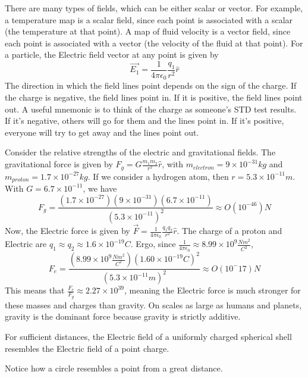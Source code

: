 \documentclass[nobib]{tufte-handout}
\begin{document}
There are many types of fields, which can be either scalar 
or vector. 
For example, a temperature map is a scalar field, since
each point is associated with a scalar (the temperature at that 
point). A map of fluid velocity is a vector field, since each point 
is associated with a vector (the velocity of the fluid at that point).
For a particle, the Electric field vector at any point is given by
\[\vec{E_1} = \frac{1}{4\pi \epsilon_0}\frac{q_1}{r^2}\hat{r}\]
The direction in which the field lines point depends on the 
sign of the charge. If the charge is negative, the field lines point in.
If it is positive, the field lines point out. A useful mnemonic is
to think of the charge as someone's STD test results. If it's negative,
others will go for them and the lines point in. If it's positive, everyone
will try to get away and the lines point out.

Consider the relative strengths of the electric and 
gravitational fields. The gravitational force is given by
$F_g = G\frac{m_1m_2}{r^2}\hat{r}$, with $m_{electron} = 9 \times 10^{-31} kg$
and $m_{proton} = 1.7 \times 10^{-27} kg$. If we consider a hydrogen atom,  
then $r = 5.3 \times 10^{-11} m$. With $G = 6.7 \times 10^{-11}$, we have 
\[F_g = \frac{(1.7 \times 10^{-27})(9 \times 10^{-31})(6.7 \times 10^{-11})}{(5.3 \times 10^{-11})^2} \approx O(10^{-46})N\]
Now, the Electric force is given by $\vec{F} = \frac{1}{4\pi \epsilon_0}\frac{q_1 q_2}{r^2}\hat{r}$. 
The charge of a proton and Electric are $q_1 \approx q_2 \approx 1.6 \times 10^{-19} C$.
Ergo, since $\frac{1}{4\pi \epsilon_0} \approx 8.99 \times 10^9 \frac{Nm^2}{C^2}$, 
\[F_e = \frac{(8.99 \times 10^9 \frac{Nm^2}{C^2})(1.60\times10^{-19}C)^2}{(5.3\times10^{-11}m)^2} \approx O(10^-17)N\]
This means that $\frac{F_e}{F_g}\approx 2.27 \times 10^{39}$, meaning the Electric force is
much stronger for these masses and charges than gravity. On scales as large as humans and planets,
gravity is the dominant force because gravity is strictly additive.

For sufficient distances, the Electric field
of a uniformly charged spherical shell resembles
the Electric field of a point charge. 

\begin{marginfigure}
    \begin{center}
    \end{center}

    \caption{Notice how a circle resembles a point from a great distance.}
    \label{fig:long-distance-point-sphere}
\end{marginfigure}
\end{document}
